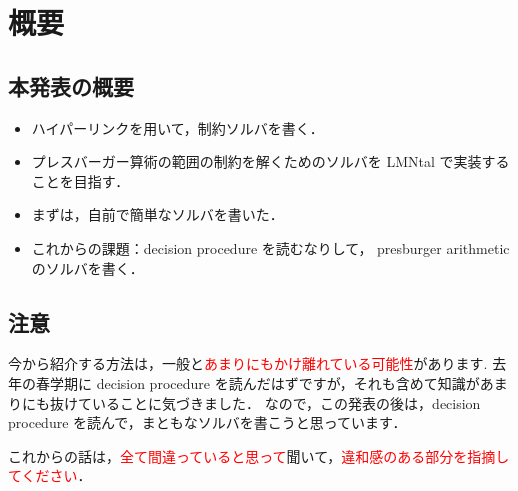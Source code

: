\chapter{概要}
\section{本発表の概要}
\begin{itemize}
    \item ハイパーリンクを用いて，制約ソルバを書く．
    \item プレスバーガー算術の範囲の制約を解くためのソルバを LMNtal で実装することを目指す．
    \item まずは，自前で簡単なソルバを書いた．
    \item これからの課題：decision procedure を読むなりして， presburger arithmetic のソルバを書く．
\end{itemize}

\section{注意}
今から紹介する方法は，一般と\textcolor{red}{あまりにもかけ離れている可能性}があります.
去年の春学期に decision procedure を読んだはずですが，それも含めて知識があまりにも抜けていることに気づきました．
なので，この発表の後は，decision procedure を読んで，まともなソルバを書こうと思っています．

これからの話は，\textcolor{red}{全て間違っていると思って}聞いて，\textcolor{red}{違和感のある部分を指摘してください}．



\par


